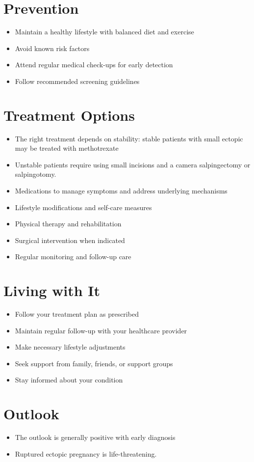 \section{Prevention}
\begin{itemize}[noitemsep]
  \item Maintain a healthy lifestyle with balanced diet and exercise
  \item Avoid known risk factors
  \item Attend regular medical check-ups for early detection
  \item Follow recommended screening guidelines
\end{itemize}
\section{Treatment Options}
\begin{itemize}[noitemsep]
  \item The right treatment depends on stability: stable patients with small ectopic may be treated with methotrexate
  \item Unstable patients require using small incisions and a camera salpingectomy or salpingotomy.
  \item Medications to manage symptoms and address underlying mechanisms
  \item Lifestyle modifications and self-care measures
  \item Physical therapy and rehabilitation
  \item Surgical intervention when indicated
  \item Regular monitoring and follow-up care
\end{itemize}
\section{Living with It}
\begin{itemize}[noitemsep]
  \item Follow your treatment plan as prescribed
  \item Maintain regular follow-up with your healthcare provider
  \item Make necessary lifestyle adjustments
  \item Seek support from family, friends, or support groups
  \item Stay informed about your condition
\end{itemize}
\section{Outlook}
\begin{itemize}[noitemsep]
  \item The outlook is generally positive with early diagnosis
  \item Ruptured ectopic pregnancy is life-threatening.
\end{itemize}
